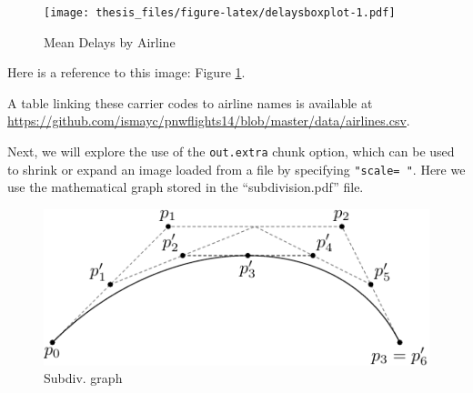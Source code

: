 \documentclass[12pt,twoside]{reedthesis}
\begin{document}
  \begin{Shaded}
  \end{Shaded}
  
  \begin{figure}
  \centering
  \texttt{[image: thesis\_files/figure-latex/delaysboxplot-1.pdf]}
  \caption{\label{fig:delaysboxplot}Mean Delays by Airline}
  \end{figure}
  
  Here is a reference to this image: Figure \ref{fig:delaysboxplot}.
  
  A table linking these carrier codes to airline names is available at
  \url{https://github.com/ismayc/pnwflights14/blob/master/data/airlines.csv}.
  
  \clearpage
  
  Next, we will explore the use of the \texttt{out.extra} chunk option,
  which can be used to shrink or expand an image loaded from a file by
  specifying \texttt{"scale=\ "}. Here we use the mathematical graph
  stored in the ``subdivision.pdf'' file.
  
  \begin{figure}
  \includegraphics[scale=0.75]{figure/subdivision} \caption{Subdiv. graph}\label{fig:subd}
  \end{figure}
  
\end{document}
